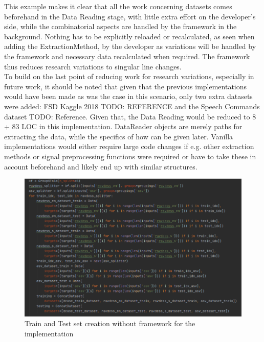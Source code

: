 This example makes it clear that all the work concerning datasets comes beforehand in the Data Reading stage, with little extra effort on the developer's side, while the combinatorial aspects are handled by the framework in the background. Nothing has to be explicitly reloaded or recalculated, as seen when adding the ExtractionMethod, by the developer as variations will be handled by the framework and necessary data recalculated when required. The framework thus reduces research variations to singular line changes.\\

To build on the last point of reducing work for research variations, especially in future work, it should be noted that given that the previous implementations would have been made as was the case in this scenario, only two extra datasets were added: FSD Kaggle 2018 TODO: REFERENCE and the Speech Commands dataset TODO: Reference. Given that, the Data Reading would be reduced to 8 + 83 LOC in this implementation. DataReader objects are merely paths for extracting the data, while the specifics of how can be given later. Vanilla implementations would either require large code changes if e.g. other extraction methods or signal preprocessing functions were required or have to take these in account beforehand and likely end up with similar structures. \\


\begin{figure}
	\centering
	\includegraphics[width=\linewidth]{screenshot002}
	\caption{Train and Test set creation without framework for the \cite{georgiev2017low} implementation}
	\label{fig:screenshot002}
\end{figure}

